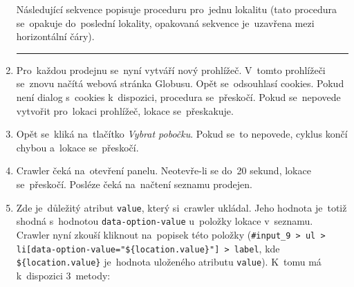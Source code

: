 \begin{enumerate}
        Následující sekvence popisuje proceduru pro~jednu lokalitu (tato
        procedura se~opakuje do~poslední lokality, opakovaná sekvence
        je~uzavřena mezi horizontální čáry).
        \clearpage  \hrule
    \item Pro~každou prodejnu se~nyní vytváří nový prohlížeč. V~tomto
        prohlížeči se~znovu načítá webová stránka Globusu. Opět
        se~odsouhlasí cookies. Pokud není dialog s~cookies k~dispozici,
        procedura se~přeskočí. Pokud se~nepovede vytvořit pro~lokaci
        prohlížeč, lokace se~přeskakuje.
    \item Opět se~kliká na~tlačítko \emph{Vybrat pobočku}. Pokud se~to
        nepovede, cyklus končí chybou a~lokace se~přeskočí.
    \item Crawler čeká na~otevření panelu. Neotevře-li se do~20 sekund,
        lokace se~přeskočí. Posléze čeká na~načtení seznamu prodejen.
    \item Zde je~důležitý atribut \texttt{value}, který si~crawler ukládal.
        Jeho hodnota je~totiž shodná s~hodnotou \texttt{data-option-value}
        u~položky lokace v~seznamu. Crawler nyní zkouší kliknout na~popisek
        této položky (\texttt{\#input\_9 > ul >
        li[data-option-value="\$\{location.value\}"] > label},
        kde \texttt{\$\{location.value\}} je~hodnota uloženého atributu
        \texttt{value}). K~tomu má k~dispozici 3~metody:
        

\end{enumerate}
